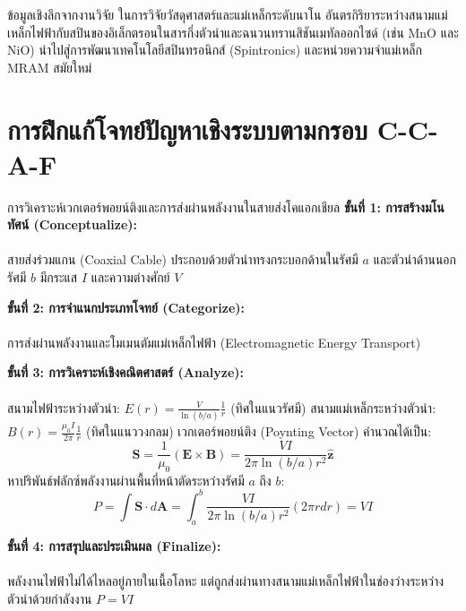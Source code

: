 \begin{researchbox}{ข้อมูลเชิงลึกจากงานวิจัย}
ในการวิจัยวัสดุศาสตร์และแม่เหล็กระดับนาโน อันตรกิริยาระหว่างสนามแม่เหล็กไฟฟ้ากับสปินของอิเล็กตรอนในสารกึ่งตัวนำและฉนวนทรานสิชันเมทัลออกไซด์ (เช่น $\text{MnO}$ และ $\text{NiO}$) นำไปสู่การพัฒนาเทคโนโลยีสปินทรอนิกส์ (Spintronics) และหน่วยความจำแม่เหล็ก MRAM สมัยใหม่
\end{researchbox}

\section{การฝึกแก้โจทย์ปัญหาเชิงระบบตามกรอบ C-C-A-F}

\begin{ccafsolution}{การวิเคราะห์เวกเตอร์พอยน์ติงและการส่งผ่านพลังงานในสายส่งโคแอกเชียล}
\textbf{ขั้นที่ 1: การสร้างมโนทัศน์ (Conceptualize):}\\\\ สายส่งร่วมแกน (Coaxial Cable) ประกอบด้วยตัวนำทรงกระบอกด้านในรัศมี $a$ และตัวนำด้านนอกรัศมี $b$ มีกระแส $I$ และความต่างศักย์ $V$

\vspace{4pt}
\textbf{ขั้นที่ 2: การจำแนกประเภทโจทย์ (Categorize):}\\\\ การส่งผ่านพลังงานและโมเมนตัมแม่เหล็กไฟฟ้า (Electromagnetic Energy Transport)

\vspace{4pt}
\textbf{ขั้นที่ 3: การวิเคราะห์เชิงคณิตศาสตร์ (Analyze):}\\\\ สนามไฟฟ้าระหว่างตัวนำ: $E(r) = \frac{V}{\ln(b/a)}\frac{1}{r}$ (ทิศในแนวรัศมี)
สนามแม่เหล็กระหว่างตัวนำ: $B(r) = \frac{\mu_0 I}{2\pi}\frac{1}{r}$ (ทิศในแนววงกลม)
เวกเตอร์พอยน์ติง (Poynting Vector) คำนวณได้เป็น:
\begin{equation}
\mathbf{S} = \frac{1}{\mu_0}(\mathbf{E} \times \mathbf{B}) = \frac{VI}{2\pi \ln(b/a) r^2} \mathbf{\hat{z}}
\end{equation}
หาปริพันธ์ฟลักซ์พลังงานผ่านพื้นที่หน้าตัดระหว่างรัศมี $a$ ถึง $b$:
\begin{equation}
P = \int \mathbf{S}\cdot d\mathbf{A} = \int_{a}^{b} \frac{VI}{2\pi \ln(b/a) r^2} (2\pi r dr) = VI
\end{equation}

\vspace{4pt}
\textbf{ขั้นที่ 4: การสรุปและประเมินผล (Finalize):}\\\\ พลังงานไฟฟ้าไม่ได้ไหลอยู่ภายในเนื้อโลหะ แต่ถูกส่งผ่านทางสนามแม่เหล็กไฟฟ้าในช่องว่างระหว่างตัวนำด้วยกำลังงาน $P = VI$
\end{ccafsolution}

